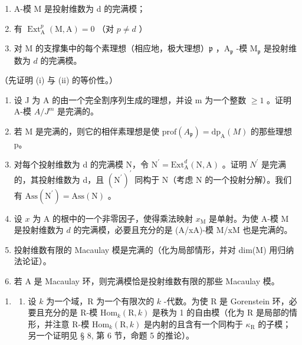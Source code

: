 \begin{enumerate}
\def\labelenumi{(\roman{enumi})}
\item
  A-模 M 是投射维数为 d 的完满模；
\item
  有 \(\operatorname{Ext}_{\mathrm{A}}^{p}(\mathrm{M},\mathrm{A}) = 0\) （对 \(p\neq d\) ）
\item
  对 M 的支撑集中的每个素理想（相应地，极大理想）\(\mathfrak{p}\) ，\(\mathrm{A}_{\mathfrak{p}}\) -模 \(\mathrm{M}_{\mathfrak{p}}\) 是投射维数为 \(d\) 的完满模。
\end{enumerate}

（先证明 (i) 与 (ii) 的等价性。）

\begin{enumerate}
\def\labelenumi{\alph{enumi})}
\setcounter{enumi}{1}
\item
  设 J 为 A 的由一个完全割序列生成的理想，并设 m 为一个整数 \(\geqslant 1\) 。证明 A-模 \(A/J^{m}\) 是完满的。
\item
  若 M 是完满的，则它的相伴素理想是使 \(\text{prof}(A_{\mathfrak{p}}) = \text{dp}_{\mathrm{A}}(M)\) 的那些理想 p。
\item
  对每个投射维数为 d 的完满模 N，令 \(\mathrm{N}^{\prime} = \mathrm{Ext}_{\mathrm{A}}^{d}(\mathrm{N}, \mathrm{A})\) 。证明 \(N^{\prime}\) 是完满的，其投射维数为 d，且 \((\mathrm{N}^{\prime})^{\prime}\) 同构于 N（考虑 N 的一个投射分解）。我们有 \(\mathrm{Ass}(\mathrm{N}^{\prime}) = \mathrm{Ass}(\mathrm{N})\) 。
\item
  设 \(x\) 为 A 的根中的一个非零因子，使得乘法映射 \(x_{\mathrm{M}}\) 是单射。为使 A-模 M 是投射维数为 \(d\) 的完满模，必要且充分的是 (A/xA)-模 M/xM 也是完满的。
\item
  投射维数有限的 Macaulay 模是完满的（化为局部情形，并对 dim(M) 用归纳法论证）。
\item
  若 A 是 Macaulay 环，则完满模恰是投射维数有限的那些 Macaulay 模。
\end{enumerate}

\begin{enumerate}
\def\labelenumi{\arabic{enumi})}
\setcounter{enumi}{4}
\tightlist
\item
  \begin{enumerate}
  \def\labelenumii{\alph{enumii})}
  \tightlist
  \item
    设 \(k\) 为一个域，R 为一个有限次的 \(k\) -代数。为使 R 是 Gorenstein 环，必要且充分的是 R-模 \(\mathrm{Hom}_{k}(\mathrm{R}, k)\) 是秩为 1 的自由模（化为 R 是局部的情形，并注意 R-模 \(\mathrm{Hom}_{k}(\mathrm{R}, k)\) 是内射的且含有一个同构于 \(\kappa_{\mathrm{R}}\) 的子模；另一个证明见 § 8, 第 6 节，命题 5 的推论）。
  \end{enumerate}
\end{enumerate}


